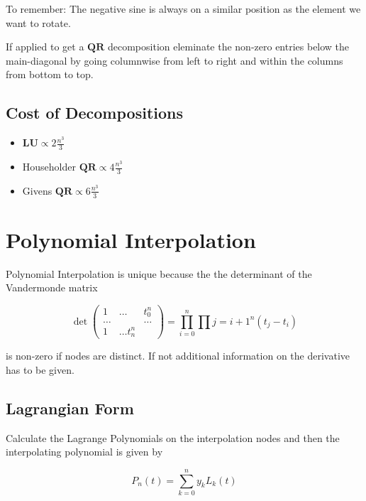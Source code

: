 \documentclass[
    a4paper,
    11pt
]{article}
\begin{document}
To remember: The negative sine is always on a similar position as the element we
want to rotate.


If applied to get a $\mathbf{QR}$ decomposition eleminate the non-zero entries
below the main-diagonal by going columnwise from left to right and within the
columns from bottom to top.

\subsection{Cost of Decompositions}

\begin{itemize}
    \item $\mathbf{LU} \propto 2\frac{n^3}{3}$
    \item Householder $\mathbf{QR} \propto 4\frac{n^3}{3}$
    \item Givens $\mathbf{QR} \propto 6\frac{n^3}{3}$

\end{itemize}

\section{Polynomial Interpolation}

Polynomial Interpolation is unique because the the determinant of the
Vandermonde matrix

\begin{equation}
    \det \begin{pmatrix}
        1 & \dots & t_0^n \\
        \hdots & & \hdots \\
        1 & \dots t_n^n
        \end{pmatrix}
    =
    \prod_{i=0}^n \prod{j=i+1}^n (t_j -t_i)
\end{equation}

is non-zero if nodes are distinct. If not additional information on the
derivative has to be given.

\subsection{Lagrangian Form}

Calculate the Lagrange Polynomials on the interpolation nodes and then the
interpolating polynomial is given by

\begin{equation}
    P_n(t) = \sum_{k=0}^n y_k L_k(t)
\end{equation}
\end{document}
